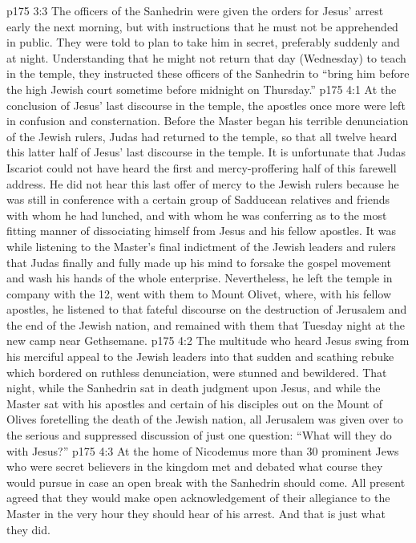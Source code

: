 \vs p175 3:3 The officers of the Sanhedrin were given the orders for Jesus’ arrest early the next morning, but with instructions that he must not be apprehended in public. They were told to plan to take him in secret, preferably suddenly and at night. Understanding that he might not return that day (Wednesday) to teach in the temple, they instructed these officers of the Sanhedrin to “bring him before the high Jewish court sometime before midnight on Thursday.”
\vs p175 4:1 At the conclusion of Jesus’ last discourse in the temple, the apostles once more were left in confusion and consternation. Before the Master began his terrible denunciation of the Jewish rulers, Judas had returned to the temple, so that all twelve heard this latter half of Jesus’ last discourse in the temple. It is unfortunate that Judas Iscariot could not have heard the first and mercy\hyp{}proffering half of this farewell address. He did not hear this last offer of mercy to the Jewish rulers because he was still in conference with a certain group of Sadducean relatives and friends with whom he had lunched, and with whom he was conferring as to the most fitting manner of dissociating himself from Jesus and his fellow apostles. It was while listening to the Master’s final indictment of the Jewish leaders and rulers that Judas finally and fully made up his mind to forsake the gospel movement and wash his hands of the whole enterprise. Nevertheless, he left the temple in company with the 12, went with them to Mount Olivet, where, with his fellow apostles, he listened to that fateful discourse on the destruction of Jerusalem and the end of the Jewish nation, and remained with them that Tuesday night at the new camp near Gethsemane.
\vs p175 4:2 \pc The multitude who heard Jesus swing from his merciful appeal to the Jewish leaders into that sudden and scathing rebuke which bordered on ruthless denunciation, were stunned and bewildered. That night, while the Sanhedrin sat in death judgment upon Jesus, and while the Master sat with his apostles and certain of his disciples out on the Mount of Olives foretelling the death of the Jewish nation, all Jerusalem was given over to the serious and suppressed discussion of just one question: “What will they do with Jesus?”
\vs p175 4:3 \pc At the home of Nicodemus more than 30 prominent Jews who were secret believers in the kingdom met and debated what course they would pursue in case an open break with the Sanhedrin should come. All present agreed that they would make open acknowledgement of their allegiance to the Master in the very hour they should hear of his arrest. And that is just what they did.
